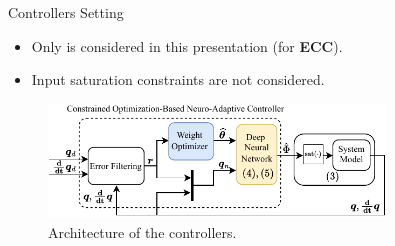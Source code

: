 \documentclass[8pt, aspectratio=169, handout]{beamer}
\newcommand{\ctxt}[2]{\color{#1}{#2}\color{black}}
\begin{document}
\begin{frame}{\insertsubsectionhead}{Controllers Setting}
  
  \begin{itemize}
    \item Only \ctxt{awesome}{weight norm constraint } is considered in this presentation (for \textbf{ECC}).
    \item Input saturation constraints are not considered.
  \end{itemize}

  \centering
  \begin{figure}
    \includegraphics[width=0.8\textwidth]{figures/Controller.drawio.pdf}
    \caption{Architecture of the controllers.}
  \end{figure}

\end{frame}
\end{document}

